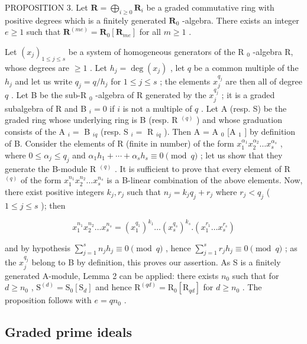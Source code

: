 PROPOSITION 3. Let \(\mathbf{R} = \bigoplus_{i\geqslant 0}\mathbf{R}_i\) be a graded commutative ring with positive degrees which is a finitely generated \(\mathbf{R}_0\) -algebra. There exists an integer \(e\geqslant 1\) such that \(\mathbf{R}^{(me)} = \mathbf{R}_0[\mathbf{R}_{me}]\) for all \(m\geqslant 1\) .

Let \((x_{j})_{1\leqslant j\leqslant s}\) be a system of homogeneous generators of the R \(_{0}\) -algebra R, whose degrees are \(\geqslant 1\) . Let \(h_{j} = \deg(x_{j})\) , let \(q\) be a common multiple of the \(h_{j}\) and let us write \(q_{j} = q/h_{j}\) for \(1 \leqslant j \leqslant s\) ; the elements \(x_{j}^{q_{j}}\) are then all of degree \(q\) . Let B be the sub-R \(_{0}\) -algebra of R generated by the \(x_{j}^{q_{j}}\) ; it is a graded subalgebra of R and B \(_{i} = 0\) if \(i\) is not a multiple of \(q\) . Let A (resp. S) be the graded ring whose underlying ring is B (resp. R \(^{(q)}\) ) and whose graduation consists of the A \(_{i} =\) B \(_{iq}\) (resp. S \(_{i} =\) R \(_{iq}\) ). Then A = A \(_{0}\) {[}A \(_{1}\) {]} by definition of B. Consider the elements of R (finite in number) of the form \(x_{1}^{\alpha_{1}}x_{2}^{\alpha_{2}}\ldots x_{s}^{\alpha_{s}}\) , where \(0 \leqslant \alpha_{j} \leqslant q_{j}\) and \(\alpha_{1}h_{1} + \cdots + \alpha_{s}h_{s} \equiv 0 \pmod{q}\) ; let us show that they generate the B-module R \(^{(q)}\) . It is sufficient to prove that every element of R \(^{(q)}\) of the form \(x_{1}^{n_{1}}x_{2}^{n_{2}}\ldots x_{s}^{n_{s}}\) is a B-linear combination of the above elements. Now, there exist positive integers \(k_{j}, r_{j}\) such that \(n_{j} = k_{j}q_{j} + r_{j}\) where \(r_{j} < q_{j}\) ( \(1 \leqslant j \leqslant s\) ); then

\[
x _ {1} ^ {n _ {1}} x _ {2} ^ {n _ {2}} \dots x _ {s} ^ {n _ {s}} = (x _ {1} ^ {q _ {1}}) ^ {k _ {1}} \dots (x _ {s} ^ {q _ {s}}) ^ {k _ {s}}. (x _ {1} ^ {r _ {1}} \dots x _ {s} ^ {r _ {s}})
\]

and by hypothesis \(\sum_{j=1}^{s} n_j h_j \equiv 0 \pmod{q}\) , hence \(\sum_{j=1}^{s} r_j h_j \equiv 0 \pmod{q}\) ; as the \(x_j^{q_j}\) belong to B by definition, this proves our assertion. As S is a finitely generated A-module, Lemma 2 can be applied: there exists \(n_0\) such that for \(d \geqslant n_0\) , \(\mathrm{S}^{(d)} = \mathrm{S}_0[\mathrm{S}_d]\) and hence \(\mathrm{R}^{(qd)} = \mathrm{R}_0[\mathrm{R}_{qd}]\) for \(d \geqslant n_0\) . The proposition follows with \(e = q n_0\) .

\subsection{Graded prime ideals}

